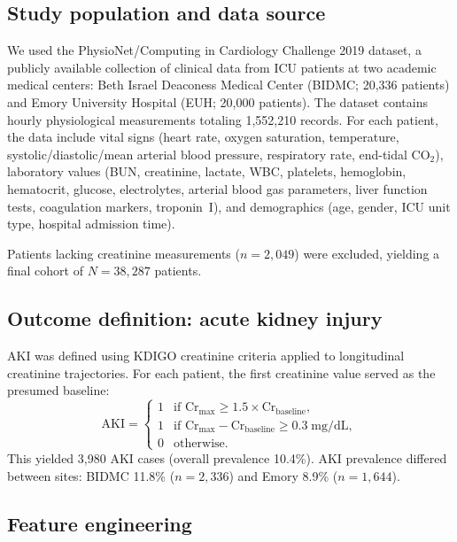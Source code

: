 \documentclass[12pt]{article}
\begin{document}
\subsection{Study population and data source}
\label{sec:data}

We used the PhysioNet/Computing in Cardiology Challenge 2019
dataset,\cite{reyna2020early} a publicly available collection of
clinical data from ICU patients at two academic medical centers:
Beth Israel Deaconess Medical Center (BIDMC; 20{,}336 patients)
and Emory University Hospital (EUH; 20{,}000 patients).  The
dataset contains hourly physiological measurements totaling
1{,}552{,}210 records.  For each patient, the data include vital
signs (heart rate, oxygen saturation, temperature,
systolic/diastolic/mean arterial blood pressure, respiratory
rate, end-tidal CO$_2$), laboratory values (BUN, creatinine,
lactate, WBC, platelets, hemoglobin, hematocrit, glucose,
electrolytes, arterial blood gas parameters, liver function
tests, coagulation markers, troponin~I), and demographics (age,
gender, ICU unit type, hospital admission time).

Patients lacking creatinine measurements ($n = 2{,}049$) were
excluded, yielding a final cohort of $N = 38{,}287$ patients.

\subsection{Outcome definition: acute kidney injury}
\label{sec:aki_def}

AKI was defined using KDIGO creatinine criteria applied to
longitudinal creatinine trajectories.\cite{kellum2021acute}
For each patient, the first creatinine value served as the
presumed baseline:
\begin{equation}
\text{AKI} = \begin{cases}
1 & \text{if } \mathrm{Cr}_{\max} \geq 1.5 \times
  \mathrm{Cr}_{\text{baseline}}, \\
1 & \text{if } \mathrm{Cr}_{\max} - \mathrm{Cr}_{\text{baseline}}
  \geq 0.3 \;\text{mg/dL}, \\
0 & \text{otherwise.}
\end{cases}
\label{eq:aki_def}
\end{equation}
This yielded 3{,}980 AKI cases (overall prevalence 10.4\%).
AKI prevalence differed between sites: BIDMC 11.8\%
($n = 2{,}336$) and Emory 8.9\% ($n = 1{,}644$).

\subsection{Feature engineering}
\label{sec:features}
\end{document}
